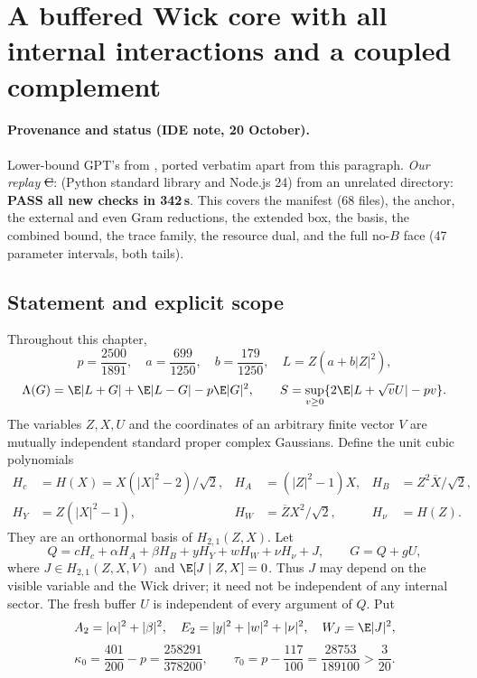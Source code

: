 \section{A buffered Wick core with all internal interactions and a coupled complement}
\label{ch:buffered-cubic-complement}

\paragraph{Provenance and status (IDE note, 20 October).} Lower-bound GPT's  from
, ported verbatim apart from this paragraph. \emph{Our replay} \st{C}:  (Python standard library and
Node.js 24) from an unrelated directory: \textbf{PASS all new checks in 342\,s}. This covers the manifest (68 files), the anchor, the external and even Gram reductions, the extended box, the
basis, the combined bound, the trace family, the resource dual, and the full no-$B$ face (47 parameter intervals, both tails).


\subsection{Statement and explicit scope}
Throughout this chapter,
\[
 p=\frac{2500}{1891},\quad a=\frac{699}{1250},\quad b=\frac{179}{1250},\quad
 L=Z(a+b|Z|^2),
\]
\[
 \Lambda(G)=\E|L+G|+\E|L-G|-p\E|G|^2,\qquad
 S=\sup_{v\ge0}\{2\E|L+\sqrt vU|-pv\}.
\]
The variables $Z,X,U$ and the coordinates of an arbitrary finite vector $V$ are mutually independent standard proper complex Gaussians. Define the unit cubic polynomials
\begin{align*}
 H_c&=H(X)=X(|X|^2-2)/\sqrt2,&
 H_A&=(|Z|^2-1)X,& H_B&=Z^2\overline X/\sqrt2,\\
 H_Y&=Z(|X|^2-1),& H_W&=\overline Z X^2/\sqrt2,&
 H_\nu&=H(Z).
\end{align*}
They are an orthonormal basis of $H_{2,1}(Z,X)$. Let
\[
 Q=cH_c+\alpha H_A+\beta H_B+yH_Y+wH_W+\nu H_\nu+J,\qquad G=Q+gU,
\]
where $J\in H_{2,1}(Z,X,V)$ and $\E[J\mid Z,X]=0$. Thus $J$ may depend on the visible variable and the Wick driver; it need not be independent of any internal sector. The fresh buffer $U$ is independent of every argument of $Q$. Put
\[
 A_2=|\alpha|^2+|\beta|^2,\quad E_2=|y|^2+|w|^2+|\nu|^2,\quad W_J=\E|J|^2,
\]
\[
 \kappa_0=\frac{401}{200}-p=\frac{258291}{378200},\qquad
 \tau_0=p-\frac{117}{100}=\frac{28753}{189100}>\frac3{20}.
\]

